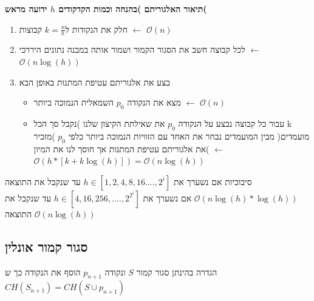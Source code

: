 \documentclass{article}
\makeatletter
\newcommand*{\saved@uline}{}
\let\saved@uline\uline
\newcommand*{\mathuline}{%
  \mathpalette{\math@uline\saved@uline}%
}
\newcommand*{\math@uline}[3]{%
  \mbox{#1{$#2#3\m@th$}}%
}
\renewcommand*{\uline}{%
  \relax  
  \ifmmode
    \expandafter\mathuline
  \else
    \expandafter\saved@uline
  \fi
}
\makeatother
\begin{document}
\noindent\textbf{תיאור האלגוריתם )בהנחה וכמות הקדקודים $h$ ידועה מראש( }
\begin{enumerate}
\item חלק את הנקודות ל$k=\frac{n}{h}$ קבוצות $\leftarrow$ $\mathcal{O}(n)$
\item לכל קבוצה חשב את הסגור הקמור ושמור אותה במבנה נתונים היררכי $\leftarrow$ $\mathcal{O}(n\log(h))$
\item בצע את אלגוריתם עטיפת המתנות באופן הבא
\begin{itemize}
\item מצא את הנקודה $p_0$ השמאלית הנמוכה ביותר $\leftarrow$ $\mathcal{O}(n)$
\item עבור כל קבוצה נבצע על הנקודה $p_0$ את שאילתת הקיצון שלנו )נקבל סך הכל k מועמדים( מבין המועמדים נבחר את האחד עם הזוויות הנמוכה ביותר כלפי $p_0$ )מזכיר את אלגוריתם עטיפת המתנות אך חוסך לנו את המיון( $\leftarrow$ $\mathcal{O}(h*[k+k\log(h)])=\mathcal{O}(n\log(h))$
\end{itemize}
\end{enumerate}

\noindent\uline{סיבוכיות}  אם נשערך את $h \in [1,2,4,8,16....,2^i]$ עד שנקבל את התוצאה $\mathcal{O}(n\log(h)* \log(h))$ אם נשערך את $h \in [4,16,256,....,2^{2^i}]$ עד שנקבל את התוצאה $\mathcal{O}(n\log(h))$ 

\subsection{סגור קמור אונלין}
\noindent\uline{הגדרה} בהינתן סגור קמור $S$ ונקודה $p_{n+1}$ הוסף את הנקודה כך ש$CH(S_{n+1})=CH(S \cup p_{n+1})$
\end{document}
